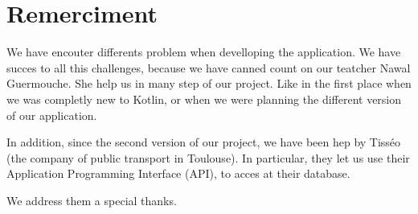 \section{Remerciment}

We have encouter differents problem when develloping the application. We have succes to all this challenges, because we have canned count on our teatcher Nawal Guermouche. She help us in many step of our project. Like in the first place when we was completly new to Kotlin, or when we were planning the different version of our application.


In addition, since the second version of our project, we have been hep by Tisséo (the company of public transport in Toulouse). In particular, they let us use their Application Programming Interface (API)\cite{tisseo}, to acces at their database.


We address them a special thanks.
